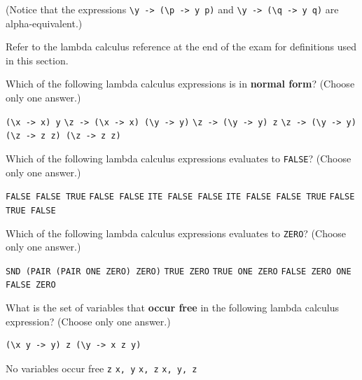 \documentclass[addpoints]{exam}
\begin{document}
\begin{questions}
\begin{solutionorbox}[\stretch{1}]
(Notice that the expressions \verb|\y -> (\p -> y p)| and \verb|\y -> (\q -> y q)| are alpha-equivalent.)
\end{solutionorbox}

\newpage

Refer to the lambda calculus reference at the end of the exam for definitions used in this section.

\question[6] Which of the following lambda calculus expressions is in \textbf{normal form}? (Choose only one answer.)

\begin{checkboxes}
  \choice \verb|(\x -> x) y|
  \choice \verb|\z -> (\x -> x) (\y -> y)|
  \choice \verb|\z -> (\y -> y) z|
  \CorrectChoice \verb|\z -> (\y -> y)|
  \choice \verb|(\z -> z z) (\z -> z z)|
\end{checkboxes}

\question[6] Which of the following lambda calculus expressions evaluates to \texttt{FALSE}? (Choose only one answer.)

\begin{checkboxes}
  \choice \texttt{FALSE FALSE TRUE}
  \choice \texttt{FALSE FALSE}
  \choice \texttt{ITE FALSE FALSE}
  \choice \texttt{ITE FALSE FALSE TRUE}
  \CorrectChoice \texttt{FALSE TRUE FALSE}
\end{checkboxes}

\question[6] Which of the following lambda calculus expressions evaluates to \texttt{ZERO}? (Choose only one answer.)

\begin{checkboxes}
  \CorrectChoice \texttt{SND (PAIR (PAIR ONE ZERO) ZERO)}
  \choice \texttt{TRUE ZERO}
  \choice \texttt{TRUE ONE ZERO}
  \choice \texttt{FALSE ZERO ONE}
  \choice \texttt{FALSE ZERO}
\end{checkboxes}

\question[6] What is the set of variables that \textbf{occur free} in the following lambda calculus expression? (Choose only one answer.)

\begin{verbatim}
(\x y -> y) z (\y -> x z y)
\end{verbatim}

\begin{checkboxes}
  \choice No variables occur free
  \choice \texttt{z}
  \choice \texttt{x, y}
  \CorrectChoice \texttt{x, z}
  \choice \texttt{x, y, z}
\end{checkboxes}

\newpage


\end{questions}
\end{document}
